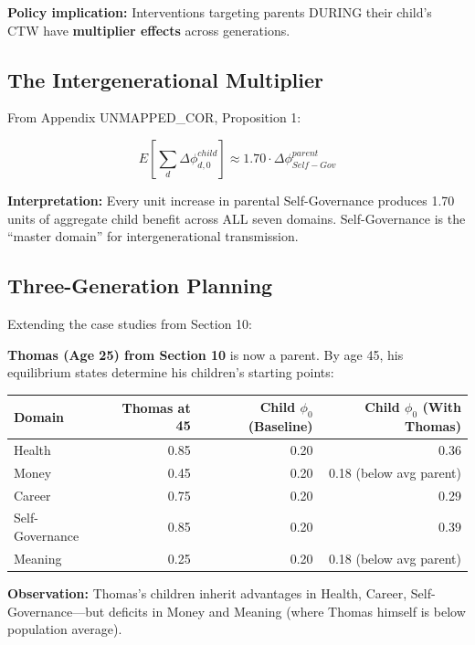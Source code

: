 {{{\textbf{Policy implication:} Interventions targeting parents DURING their child's CTW have \textbf{multiplier effects} across generations.

\subsection{The Intergenerational Multiplier}

From Appendix UNMAPPED_COR, Proposition 1:

\begin{equation}
E\left[\sum_{d} \Delta\phi^{child}_{d,0}\right] \approx 1.70 \cdot \Delta\phi^{parent}_{Self-Gov}
\end{equation}

\textbf{Interpretation:} Every unit increase in parental Self-Governance produces 1.70 units of aggregate child benefit across ALL seven domains. Self-Governance is the ``master domain'' for intergenerational transmission.

\subsection{Three-Generation Planning}

Extending the case studies from Section 10:

\textbf{Thomas (Age 25) from Section 10} is now a parent. By age 45, his equilibrium states determine his children's starting points:

\begin{center}
\small
\begin{tabular}{@{}lrrr@{}}
\toprule
\textbf{Domain} & \textbf{Thomas at 45} & \textbf{Child $\phi_0$ (Baseline)} & \textbf{Child $\phi_0$ (With Thomas)} \\
\midrule
Health & 0.85 & 0.20 & 0.36 \\
Money & 0.45 & 0.20 & 0.18 (below avg parent) \\
Career & 0.75 & 0.20 & 0.29 \\
Self-Governance & 0.85 & 0.20 & 0.39 \\
Meaning & 0.25 & 0.20 & 0.18 (below avg parent) \\
\bottomrule
\end{tabular}
\end{center}

\textbf{Observation:} Thomas's children inherit advantages in Health, Career, Self-Governance---but deficits in Money and Meaning (where Thomas himself is below population average).

}}}
